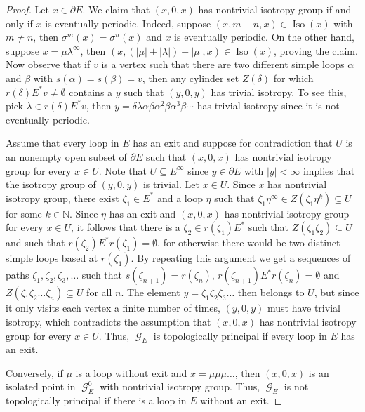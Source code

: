 \documentclass[12pt, a4paper]{amsart}
\numberwithin{equation}{section}
\theoremstyle{definition}
\theoremstyle{remark}
\begin{document}
\begin{proof}
	Let $x\in \partial E$. We claim that $(x,0,x)$ has nontrivial isotropy group if and only if $x$ is eventually periodic. Indeed, suppose $(x,m-n,x) \in {\operatorname{Iso}}(x)$ with $m\neq n$, then $\sigma^m(x)=\sigma^n(x)$ and $x$ is eventually periodic. On the other hand, suppose $x=\mu \lambda^\infty$, then $(x,(|\mu|+|\lambda|)-|\mu|,x) \in {\operatorname{Iso}}(x)$, proving the claim.
Now observe that if $v$ is a vertex such that there are two different simple loops $\alpha$ and $\beta$ with $s(\alpha)=s(\beta)=v$, then any cylinder set $Z(\delta)$ for which $r(\delta)E^*v\ne\emptyset$ contains a $y$ such that $(y,0,y)$ has trivial isotropy. To see this, pick $\lambda \in r(\delta)E^*v$, then $y=\delta\lambda\alpha\beta\alpha^2\beta\alpha^3 \beta \cdots$ has trivial isotropy since it is not eventually periodic.
	
Assume that every loop in $E$ has an exit and suppose for contradiction that $U$ is an nonempty open subset of $\partial E$ such that $(x,0,x)$ has nontrivial isotropy group for every $x\in U$. Note that $U \subseteq E^\infty$ since $y \in \partial E$ with $|y| < \infty$ implies that the isotropy group of $(y,0,y)$ is trivial. Let $x\in U$. Since $x$ has nontrivial isotropy group, there exist $\zeta_1\in E^*$ and a loop $\eta$ such that $\zeta_1\eta^\infty \in Z(\zeta_1\eta^k) \subseteq U$ for some $k \in {\mathbb{N}}$. Since $\eta$ has an exit and $(x,0,x)$ has nontrivial isotropy group for every $x\in U$, it follows that there is a $\zeta_2\in r(\zeta_1)E^*$ such that $Z(\zeta_1\zeta_2)\subseteq U$ and such that $r(\zeta_2)E^*r(\zeta_1)=\emptyset$, for otherwise there would be two distinct simple loops based at $r(\zeta_1)$. By repeating this argument we get a sequences of paths $\zeta_1,\zeta_2,\zeta_3,\dots$ such that $s(\zeta_{n+1})=r(\zeta_n)$, $r(\zeta_{n+1})E^*r(\zeta_n)=\emptyset$ and $Z(\zeta_1\zeta_2\dots\zeta_n)\subseteq U$ for all $n$. The element $y=\zeta_1\zeta_2\zeta_3\dots$ then belongs to $U$, but since it only visits each vertex a finite number of times, $(y,0,y)$ must have trivial isotropy, which contradicts the assumption that $(x,0,x)$ has nontrivial isotropy group for every $x\in U$. Thus, ${\operatorname{\mathcal{G}}}_E$ is topologically principal if every loop in $E$ has an exit.
	
	Conversely, if $\mu$ is a loop without exit and $x=\mu\mu\mu\dots$, then $(x,0,x)$ is an isolated point in ${\operatorname{\mathcal{G}}}_E^0$ with nontrivial isotropy group. Thus, ${\operatorname{\mathcal{G}}}_E$ is not topologically principal if there is a loop in $E$ without an exit.
\end{proof}
\end{document}
